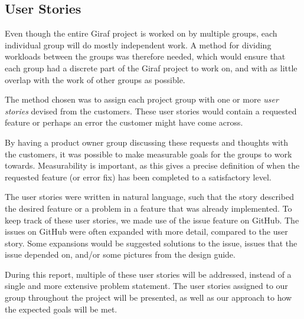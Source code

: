 \subsection{User Stories} \label{ssec:UserStories}
Even though the entire Giraf project is worked on by multiple groups, each individual group will do mostly independent work.
A method for dividing workloads between the groups was therefore needed, which would ensure that each group had a discrete part of the Giraf project to work on, and with as little overlap with the work of other groups as possible.

The method chosen was to assign each project group with one or more \textit{user stories} devised from the customers.
These user stories would contain a requested feature or perhaps an error the customer might have come across.

By having a product owner group discussing these requests and thoughts with the customers, it was possible to make measurable goals for the groups to work towards.
Measurability is important, as this gives a precise definition of when the requested feature (or error fix) has been completed to a satisfactory level.

The user stories were written in natural language, such that the story described the desired feature or a problem in a feature that was already implemented.
To keep track of these user stories, we made use of the issue feature on GitHub.
The issues on GitHub were often expanded with more detail, compared to the user story.
Some expansions would be suggested solutions to the issue, issues that the issue depended on, and/or some pictures from the design guide.

During this report, multiple of these user stories will be addressed, instead of a single and more extensive problem statement.
The user stories assigned to our group throughout the project will be presented, as well as our approach to how the expected goals will be met.
